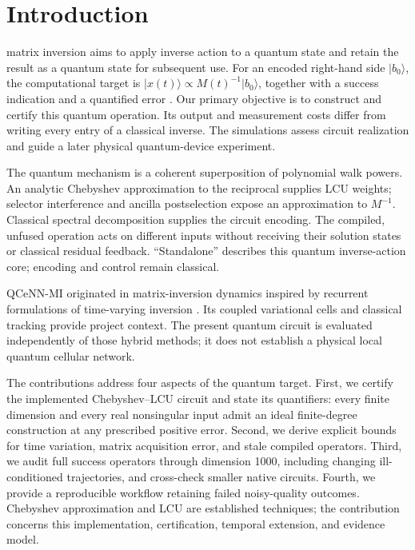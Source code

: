 \documentclass[journal]{IEEEtran}
\newcommand{\ket}[1]{\lvert#1\rangle}
\begin{document}
\section{Introduction}
 matrix inversion aims to apply inverse action to a
quantum state and retain the result as a quantum state for subsequent use.
For an encoded right-hand side $\ket{b_0}$, the computational target is
$\ket{x(t)}\propto M(t)^{-1}\ket{b_0}$, together with a success indication and a
quantified error \cite{harrow2009,childs2017,gilyen2019}. Our primary
objective is to construct and certify this quantum operation. Its output
and measurement costs differ from writing every entry of a classical
inverse. The simulations assess circuit realization and guide a later
physical quantum-device experiment.

The quantum mechanism is a coherent superposition of polynomial walk powers.
An analytic Chebyshev approximation to the reciprocal supplies LCU weights;
selector interference and ancilla postselection expose an approximation to
$M^{-1}$. Classical spectral decomposition supplies the circuit encoding.
The compiled, unfused operation acts on different inputs without receiving
their solution states or classical residual feedback. ``Standalone''
describes this quantum inverse-action core; encoding and control remain
classical.

QCeNN-MI originated in matrix-inversion dynamics inspired by recurrent
formulations of time-varying inversion \cite{tavakkoli2019}. Its coupled
variational cells and classical tracking provide project context. The
present quantum circuit is evaluated independently of those hybrid
methods; it does not establish a physical local quantum cellular network.

The contributions address four aspects of the quantum target. First, we
certify the implemented Chebyshev--LCU circuit and state its quantifiers:
every finite dimension and every real nonsingular input admit an ideal
finite-degree construction at any prescribed positive error. Second,
we derive explicit bounds for time variation, matrix acquisition error,
and stale compiled operators. Third, we audit full success operators
through dimension 1000, including changing ill-conditioned trajectories,
and cross-check smaller native circuits. Fourth, we provide a reproducible
workflow retaining failed noisy-quality outcomes. Chebyshev approximation
and LCU are established techniques; the contribution concerns this
implementation, certification, temporal extension, and evidence model.
\end{document}
